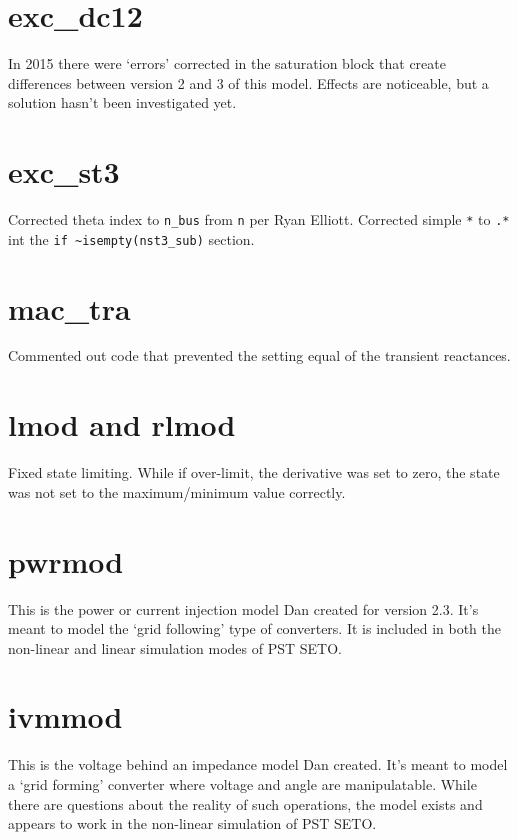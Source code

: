 \section{exc\_dc12}  
In 2015 there were `errors' corrected in the saturation block that create differences between version 2 and 3 of this model.
Effects are noticeable, but a solution hasn't been investigated yet.

\section{exc\_st3}  
Corrected theta index to \verb|n_bus| from \verb|n| per Ryan Elliott.
Corrected simple \verb|*| to \verb|.*| int the \verb|if ~isempty(nst3_sub)| section.

\section{mac\_tra}  
Commented out code that prevented the setting equal of the transient reactances.

\section{lmod and rlmod}  
Fixed state limiting.
 While if over-limit, the derivative was set to zero, the state was not set to the maximum/minimum value correctly.

\section{pwrmod}  
This is the power or current injection model Dan created for version 2.3.
It's meant to model the `grid following' type of converters.
It is included in both the non-linear and linear simulation modes of PST SETO.

\section{ivmmod}  
This is the voltage behind an impedance model Dan created.
It's meant to model a `grid forming' converter where voltage and angle are manipulatable.
While there are questions about the reality of such operations, the model exists and appears to work in the non-linear simulation  of PST SETO.

